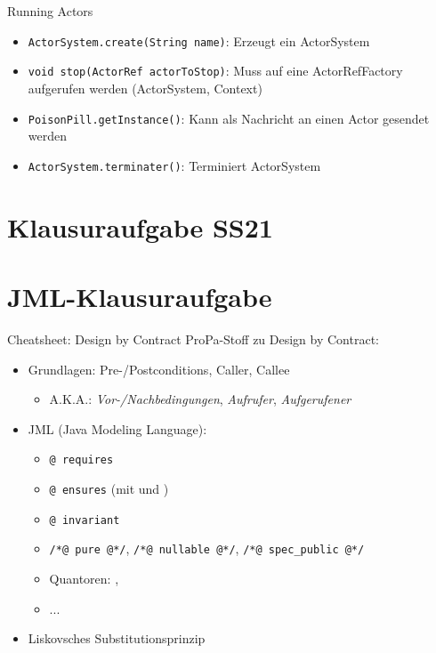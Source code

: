 \documentclass{beamer}
\begin{document}
\begin{frame}{Running Actors}
    \begin{itemize}
        \item \texttt{ActorSystem.create(String name)}: Erzeugt ein ActorSystem
        \item \texttt{void stop(ActorRef actorToStop)}: Muss auf eine ActorRefFactory aufgerufen werden (ActorSystem, Context)
        \item \texttt{PoisonPill.getInstance()}: Kann als Nachricht an einen Actor gesendet werden
        \item \texttt{ActorSystem.terminater()}: Terminiert ActorSystem
    \end{itemize}
\end{frame}

\section{Klausuraufgabe SS21}

\section{JML-Klausuraufgabe}

\begin{frame}{Cheatsheet: Design by Contract}
	ProPa-Stoff zu Design by Contract:

	\begin{itemize}
		\item Grundlagen: Pre-/Postconditions, Caller, Callee
		\begin{itemize}
                  \item A.K.A.: \emph{Vor-/Nachbedingungen}, \emph{Aufrufer}, \emph{Aufgerufener}
		\end{itemize}
		\item JML (Java Modeling Language):
		\begin{itemize}
			\item \texttt{@ requires}
			\item \texttt{@ ensures} (mit \texttt{\string\old} und \texttt{\string\result})
			\item \texttt{@ invariant}
			\item \texttt{/*@ pure @*/}, \texttt{/*@ nullable @*/}, \texttt{/*@ spec\_public @*/}
			\item Quantoren: \texttt{\string\forall}, \texttt{\string\exists}
			\item ...
		\end{itemize}
		\item Liskovsches Substitutionsprinzip
	\end{itemize}
\end{frame}
\end{document}
